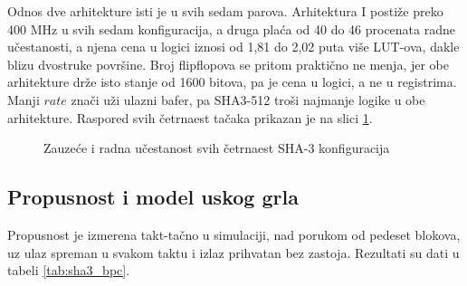 Odnos dve arhitekture isti je u svih sedam parova. Arhitektura I postiže preko 400 MHz u svih sedam konfiguracija, a druga plaća od 40 do 46 procenata radne učestanosti, a njena cena u logici iznosi od 1,81 do 2,02 puta više LUT-ova, dakle blizu dvostruke površine. Broj flipflopova se pritom praktično ne menja, jer obe arhitekture drže isto stanje od 1600 bitova, pa je cena u logici, a ne u registrima. Manji $rate$ znači uži ulazni bafer, pa SHA3-512 troši najmanje logike u obe arhitekture. Raspored svih četrnaest tačaka prikazan je na slici \ref{fig:sha3_lut_fmax}.

\begin{figure}[H]
\centering
{}
\caption{Zauzeće i radna učestanost svih četrnaest SHA-3 konfiguracija}
\label{fig:sha3_lut_fmax}
\end{figure}

\subsection{Propusnost i model uskog grla}
\label{subsec:rez_sha3_propusnost}

Propusnost je izmerena takt-tačno u simulaciji, nad porukom od pedeset blokova, uz ulaz spreman u svakom taktu i izlaz prihvatan bez zastoja. Rezultati su dati u tabeli \ref{tab:sha3_bpc}.

